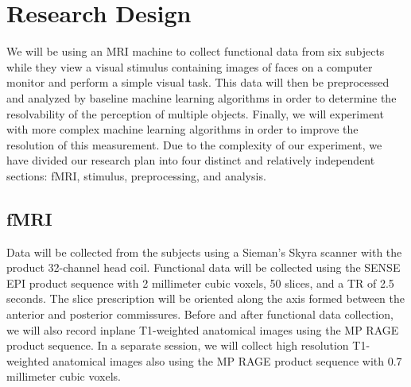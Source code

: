 \documentclass[12pt]{article}
\begin{document}
\section{Research Design}
We will be using an MRI machine to collect functional data from six subjects while they view a visual stimulus containing images of faces on a computer monitor and perform a simple visual task.
This data will then be preprocessed and analyzed by baseline machine learning algorithms in order to determine the resolvability of the perception of multiple objects.
Finally, we will experiment with more complex machine learning algorithms in order to improve the resolution of this measurement.
Due to the complexity of our experiment, we have divided our research plan into four distinct and relatively independent sections: fMRI, stimulus, preprocessing, and analysis.

\subsection{fMRI}
Data will be collected from the subjects using a Sieman's Skyra scanner with the product 32-channel head coil.
Functional data will be collected using the SENSE EPI product sequence with 2 millimeter cubic voxels, 50 slices, and a TR of 2.5 seconds.
The slice prescription will be oriented along the axis formed between the anterior and posterior commissures.
Before and after functional data collection, we will also record inplane T1-weighted anatomical images using the MP RAGE product sequence.
In a separate session, we will collect high resolution T1-weighted anatomical images also using the MP RAGE product sequence with 0.7 millimeter cubic voxels.
\end{document}
